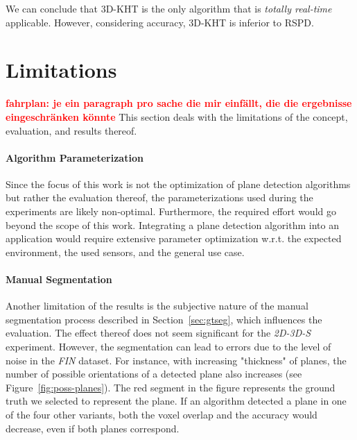\documentclass[main.tex]{subfiles}
\begin{document}
We can conclude that 3D-KHT is the only algorithm that is \textit{totally real-time} applicable. However, considering accuracy, 3D-KHT is inferior to RSPD.


\section{Limitations}
\textbf{\textcolor{red}{fahrplan: je ein paragraph pro sache die mir einfällt, die die ergebnisse eingeschränken könnte}}
This section deals with the limitations of the concept, evaluation, and results thereof.
\paragraph{Algorithm Parameterization}
Since the focus of this work is not the optimization of plane detection algorithms but rather the evaluation thereof, the parameterizations used during the experiments are likely non-optimal. Furthermore, the required effort would go beyond the scope of this work. Integrating a plane detection algorithm into an application would require extensive parameter optimization w.r.t. the expected environment, the used sensors, and the general use case.

\paragraph{Manual Segmentation}
Another limitation of the results is the subjective nature of the manual segmentation process described in Section~\ref{sec:gtseg}, which influences the evaluation. The effect thereof does not seem significant for the \textit{2D-3D-S} experiment. However, the segmentation can lead to errors due to the level of noise in the \textit{FIN} dataset. For instance, with increasing "thickness" of planes, the number of possible orientations of a detected plane also increases (see Figure~\ref{fig:poss-planes}). The red segment in the figure represents the ground truth we selected to represent the plane. If an algorithm detected a plane in one of the four other variants, both the voxel overlap and the accuracy would decrease, even if both planes correspond.
\end{document}

